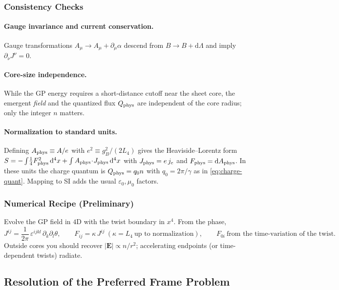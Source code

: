 \subsubsection{Consistency Checks}
\paragraph{Gauge invariance and current conservation.}
Gauge transformations $A_\mu\!\to\! A_\mu+\partial_\mu\alpha$ descend from $B\!\to\! B+\mathrm d\Lambda$ and imply $\partial_\nu J^\nu=0$.

\paragraph{Core-size independence.}
While the GP energy requires a short-distance cutoff near the sheet core, the emergent \emph{field} and the quantized flux $Q_{\rm phys}$ are independent of the core radius; only the integer $n$ matters.

\paragraph{Normalization to standard units.}
Defining $A_{\rm phys}\equiv A/e$ with $e^2\equiv g_B^2/(2L_4)$ gives the Heaviside--Lorentz form $S=-\int\!\frac14 F_{\rm phys}^2\,\mathrm d^4x+\int A_{\rm phys}\!\cdot\!J_{\rm phys}\,\mathrm d^4x$ with $J_{\rm phys}=e\,j_e$ and $F_{\rm phys}=\mathrm dA_{\rm phys}$. In these units the charge quantum is $Q_{\rm phys}=q_0 n$ with $q_0=2\pi/\gamma$ as in \eqref{eq:charge-quant}. Mapping to SI adds the usual $\varepsilon_0,\mu_0$ factors.

\subsubsection{Numerical Recipe (Preliminary)}
Evolve the GP field in $4$D with the twist boundary in $x^4$. From the phase,
\begin{equation}
J^{ij}=\frac{1}{2\pi}\,\varepsilon^{ijkl}\,\partial_k\partial_l\theta,\qquad
F_{ij}=\kappa\,J^{ij}\ (\kappa=L_4\ \text{up to normalization}),\qquad
F_{0i}\ \text{from the time-variation of the twist}.
\end{equation}
Outside cores you should recover $|\mathbf E|\propto n/r^2$; accelerating endpoints (or time-dependent twists) radiate.

\subsection{Resolution of the Preferred Frame Problem}

